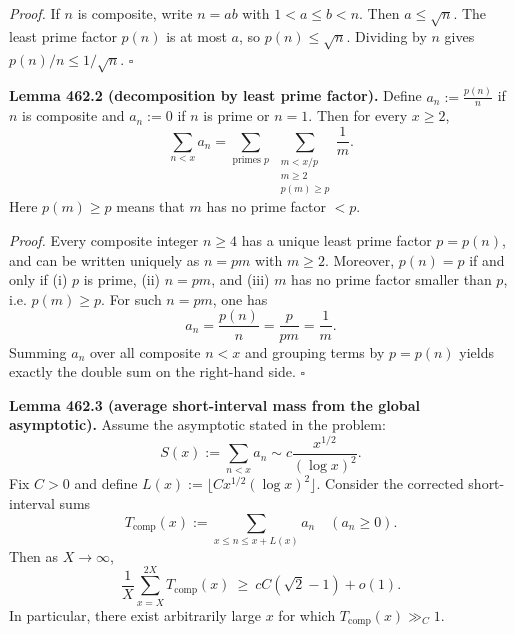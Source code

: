 \textit{Proof.}
If $n$ is composite, write $n=ab$ with $1<a\le b<n$. Then $a\le\sqrt{n}$.
The least prime factor $p(n)$ is at most $a$, so $p(n)\le\sqrt{n}$. Dividing by $n$ gives $p(n)/n\le 1/\sqrt{n}$. \hfill$\square$

\medskip
\noindent\textbf{Lemma 462.2 (decomposition by least prime factor).}
Define $a_n:=\frac{p(n)}{n}$ if $n$ is composite and $a_n:=0$ if $n$ is prime or $n=1$.
Then for every $x\ge 2$,
\[\sum_{n<x} a_n = \sum_{\text{primes }p}\ \sum_{\substack{m<x/p\\ m\ge 2\\ p(m)\ge p}} \frac1m.
\]
Here $p(m)\ge p$ means that $m$ has no prime factor $<p$.

\textit{Proof.}
Every composite integer $n\ge 4$ has a unique least prime factor $p=p(n)$, and can be written uniquely as $n=p m$ with $m\ge 2$.
Moreover, $p(n)=p$ if and only if (i) $p$ is prime, (ii) $n=pm$, and (iii) $m$ has no prime factor smaller than $p$, i.e. $p(m)\ge p$.
For such $n=pm$, one has
\[a_n = \frac{p(n)}{n} = \frac{p}{pm} = \frac1m.
\]
Summing $a_n$ over all composite $n<x$ and grouping terms by $p=p(n)$ yields exactly the double sum on the right-hand side. \hfill$\square$

\medskip
\noindent\textbf{Lemma 462.3 (average short-interval mass from the global asymptotic).}
Assume the asymptotic stated in the problem:
\[S(x):=\sum_{n<x} a_n\sim c\frac{x^{1/2}}{(\log x)^2}.\]
Fix $C>0$ and define $L(x):=\lfloor C x^{1/2}(\log x)^2\rfloor$.  Consider the corrected short-interval sums
\[T_{\mathrm{comp}}(x):=\sum_{x\le n\le x+L(x)} a_n\quad (a_n\ge 0).\]
Then as $X\to\infty$,
\[\frac1{X}\sum_{x=X}^{2X} T_{\mathrm{comp}}(x)\ \ge\ cC(\sqrt{2}-1)+o(1).\]
In particular, there exist arbitrarily large $x$ for which $T_{\mathrm{comp}}(x)\gg_C 1$.

